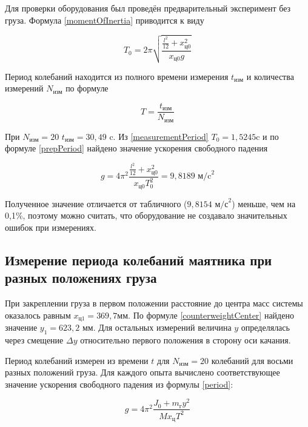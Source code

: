 \documentclass[a4paper,12pt]{article} %
\begin{document}
Для проверки оборудования был проведён предварительный эксперимент без груза. Формула \eqref{momentOfInertia} приводится к виду

\begin{equation}
    T_0 = 2\pi\sqrt{\frac{\frac{l^2}{12}+x_\text{ц0}^2}{x_\text{ц0}g}}
    \label{prepPeriod}
\end{equation}

Период колебаний находится из полного времени измерения $t_\text{изм}$ и количества измерений $N_\text{изм}$ по формуле

\begin{equation}
     T = \frac{t_\text{изм}}{N_\text{изм}}
     \label{measurementPeriod}
\end{equation}

При $ N_\text{изм} = 20 $ $ t_\text{изм} = 30,49 \text{ c}$. Из \eqref{measurementPeriod} $ T_0 = 1,5245 \text{c}$ и по формуле \eqref{prepPeriod} найдено значение ускорения свободного падения

\begin{equation}
    g = 4\pi^2 \frac {\frac{l^2}{12} + x_\text{ц0}^2}{x_\text{ц0}T_0^2} = 9,8189 \text{ м/c}^2
\end{equation}

Полученное значение отличается от табличного ($ 9,8154 \text{ м/с}^2$) меньше, чем на 0,1\%, поэтому можно считать, что оборудование не создавало значительных ошибок при измерениях.

\subsection{Измерение периода колебаний маятника при разных положениях груза}

При закреплении груза в первом положении расстояние до центра масс системы оказалось равным $x_\text{ц1} = 369,7 \text{мм}$. По формуле \eqref{counterweightCenter} найдено значение $ y_1 = 623,2 \text{ мм}$. Для остальных измерений величина $ y $ определялась через смещение $ \Delta y $ относительно первого положения в сторону оси качания. 

Период колебаний измерен из времени $ t $ для $ N_\text{изм} = 20 $ колебаний для восьми разных положений груза. Для каждого опыта вычислено соответствующее значение ускорения свободного падения из формулы \eqref{period}:

\begin{equation}
    g = 4\pi^2 \frac{J_0 + m_\text{г}y^2}{Mx_\text{ц}T^2}
\end{equation}
\end{document}
